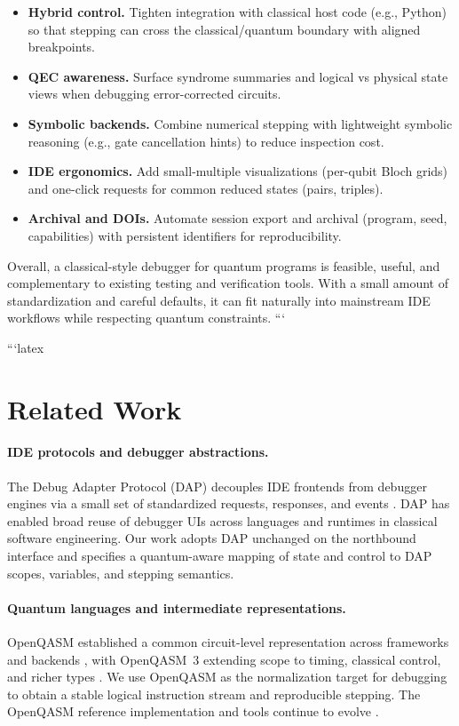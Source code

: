 \documentclass[12pt]{article}
\begin{document}
\begin{itemize}
\begin{itemize}
  \item \textbf{Hybrid control.} Tighten integration with classical host code (e.g., Python) so that stepping can cross the classical/quantum boundary with aligned breakpoints.
  \item \textbf{QEC awareness.} Surface syndrome summaries and logical vs physical state views when debugging error-corrected circuits.
  \item \textbf{Symbolic backends.} Combine numerical stepping with lightweight symbolic reasoning (e.g., gate cancellation hints) to reduce inspection cost.
  \item \textbf{IDE ergonomics.} Add small-multiple visualizations (per-qubit Bloch grids) and one-click requests for common reduced states (pairs, triples).
  \item \textbf{Archival and DOIs.} Automate session export and archival (program, seed, capabilities) with persistent identifiers for reproducibility.
\end{itemize}

Overall, a classical-style debugger for quantum programs is feasible, useful, and complementary to existing testing and verification tools. With a small amount of standardization and careful defaults, it can fit naturally into mainstream IDE workflows while respecting quantum constraints.
```

```latex
\section{Related Work}
\label{sec:related}

\paragraph{IDE protocols and debugger abstractions.}
The Debug Adapter Protocol (DAP) decouples IDE frontends from debugger engines via a small set of standardized requests, responses, and events \cite{dap}. DAP has enabled broad reuse of debugger UIs across languages and runtimes in classical software engineering. Our work adopts DAP unchanged on the northbound interface and specifies a quantum-aware mapping of state and control to DAP scopes, variables, and stepping semantics.

\paragraph{Quantum languages and intermediate representations.}
OpenQASM established a common circuit-level representation across frameworks and backends \cite{openqasm2}, with OpenQASM~3 extending scope to timing, classical control, and richer types \cite{openqasm3}. We use OpenQASM as the normalization target for debugging to obtain a stable logical instruction stream and reproducible stepping. The OpenQASM reference implementation and tools continue to evolve \cite{openqasm-github}.


\end{itemize}
\end{document}
